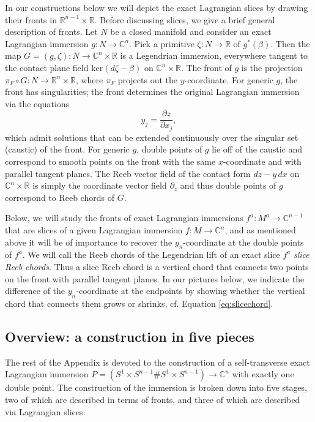 \documentclass[reqno,11pt]{amsart}
\numberwithin{equation}{section}
\theoremstyle{my}
\theoremstyle{my}
\theoremstyle{your}
\newcommand{\R}{\mathbb{R}}
\newcommand{\C}{\mathbb{C}}
\newcommand{\pa}{\partial}
\renewcommand{\ker}{\mathrm{ker}}
\begin{document}
In our constructions below we will depict the exact Lagrangian slices by drawing their fronts in $\R^{n-1}\times\R$. Before discussing slices, we give a brief general description of fronts. Let $N$ be a closed manifold and consider an exact Lagrangian immersion $g\colon N\to\C^{n}$. Pick a primitive $\zeta\colon N\to\R$ of $g^{\ast}(\beta)$. Then the map $G=(g,\zeta)\colon N\to\C^{n}\times\R$ is a Legendrian immersion, everywhere tangent to the contact plane field $\ker(d\zeta-\beta)$ on $\C^{n}\times\R$. The front of $g$ is the projection $\pi_{F}\circ G\colon N\to\R^{n}\times\R$, where $\pi_{F}$ projects out the $y$-coordinate. For generic $g$, the front has singularities; the front determines the original Lagrangian immersion via the equations
\[
y_j=\frac{\pa z}{\pa x_j},
\]  
which admit solutions that can be extended continuously over the singular set (caustic) of the front. For generic $g$, double points of $g$ lie off of the caustic and correspond to smooth points on the front with the same $x$-coordinate and with parallel tangent planes. The Reeb vector field of the contact form $dz-y\,dx$ on $\C^{n}\times\R$ is simply the coordinate vector field $\pa_{z}$ and thus double points of $g$ correspond to Reeb chords of $G$.

Below, we will study the fronts of exact Lagrangian immersions $f^{a}\colon M^{a}\to\C^{n-1}$ that are slices of a given Lagrangian immersion $f\colon M\to\C^{n}$, and as mentioned above it will be of importance to recover the $y_n$-coordinate at the double points of $f^{a}$. We will call the Reeb chords of the Legendrian lift of an exact slice $f^{a}$ \emph{slice Reeb chords}. Thus a slice Reeb chord is a vertical chord that connects two points on the front with parallel tangent planes. In our pictures below, we indicate the difference of the $y_n$-coordinate at the endpoints by showing whether the vertical chord that connects them grows or shrinks, cf.  Equation \eqref{eq:slicechord}. 

 




\subsection{Overview: a  construction in five pieces}\label{ssec:onedouble}
The rest of the Appendix is devoted to the construction of a self-transverse exact Lagrangian immersion $P = (S^1 \times S^{n-1} \# S^1 \times S^{n-1}) \rightarrow \C^n$ with exactly one double point.  The construction of the immersion is broken down into five stages, two of which are described in terms of fronts, and three of which are described via Lagrangian slices.
\end{document}
